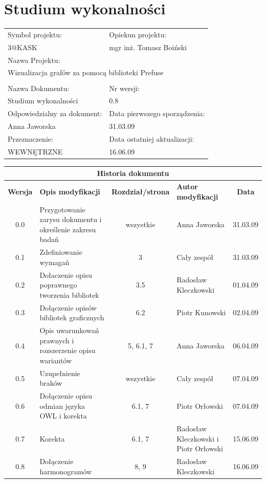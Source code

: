 

\section{Studium wykonalności}

\begin{center}
\begin{tabular}{|p{7cm}|p{7cm}|}
\hline
Symbol projektu: & Opiekun projektu:   \tabularnewline
3@KASK & mgr inż. Tomasz Boiński    \tabularnewline \hline
\multicolumn{2}{|l|}{Nazwa Projektu: } \tabularnewline
\multicolumn{2}{|l|}{Wizualizacja grafów za pomocą biblioteki Prefuse } \tabularnewline
\hline
\multicolumn{2}{l}{ } \tabularnewline %
\hline
Nazwa Dokumentu: & Nr wersji:   \tabularnewline
Studium wykonalności & 0.8 \tabularnewline \hline
Odpowiedzialny za dokument: & Data pierwszego sporządzenia:   \tabularnewline
Anna Jaworska & 31.03.09 \tabularnewline \hline
Przeznaczenie: & Data ostatniej aktualizacji:   \tabularnewline
WEWNĘTRZNE & 16.06.09 \tabularnewline \hline
\end{tabular}
\end{center}

\begin{center}
\begin{tabular}{|c|p{4cm}|c|p{3cm}|c|}
\multicolumn{5}{c}{\textbf{Historia dokumentu}} \tabularnewline \hline
\textbf{Wersja} & \textbf{Opis modyfikacji} & \textbf{Rozdział/strona} & \textbf{Autor modyfikacji} & \textbf{Data} \tabularnewline \hline
0.0 & Przygotowanie zarysu dokumentu i określenie zakresu badań & wszystkie & Anna Jaworska & 31.03.09 \tabularnewline \hline
0.1 & Zdefiniowanie wymagań  & 3 & Cały zespół & 31.03.09  \tabularnewline \hline
0.2 & Dołaczenie opisu poprawnego tworzenia bibliotek & 3.5 & Radosław Kleczkowski & 01.04.09\tabularnewline \hline
0.3 & Dołączenie opisów bibliotek graficznych  & 6.2 & Piotr Kunowski & 02.04.09 \tabularnewline \hline
0.4 & Opis uwarunkowań prawnych i rozszerzenie opisu wariantów & 5, 6.1, 7 & Anna Jaworska & 06.04.09\tabularnewline \hline
0.5 & Uzupełnienie braków & wszystkie  & Cały zespół & 07.04.09 \tabularnewline \hline
0.6 & Dołączenie opisu odmian języka OWL i korekta & 6.1, 7  & Piotr Orłowski & 07.04.09 \tabularnewline \hline
0.7 & Korekta & 6.1, 7  & Radosław Kleczkowski i Piotr Orłowski & 15.06.09 \tabularnewline \hline
0.8 & Dołączenie harmonogramów & 8, 9  & Radosław Kleczkowski & 16.06.09 \tabularnewline \hline
\end{tabular}


\end{center}

